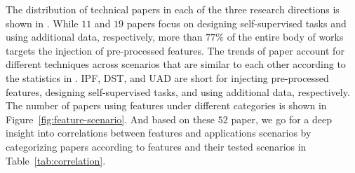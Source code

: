 The distribution of technical papers in each of the three research directions 
is shown in .
While $11$ and $19$ papers focus on designing self-supervised tasks and 
using additional data, respectively, 
more than $77\%$ of the entire body of works targets the injection of 
pre-processed features. The trends of paper account for different techniques 
across scenarios that are similar to each other according to the statistics 
in . IPF, DST, and UAD are short for injecting pre-processed features, designing self-supervised tasks, and using additional data, respectively.
The number of papers using features under different categories is 
shown in Figure~\ref{fig:feature-scenario}. 
And based on these $52$ paper, we go for a deep insight into 
correlations between features and applications scenarios by categorizing 
papers according to features and their tested scenarios in 
Table~\ref{tab:correlation}. 

